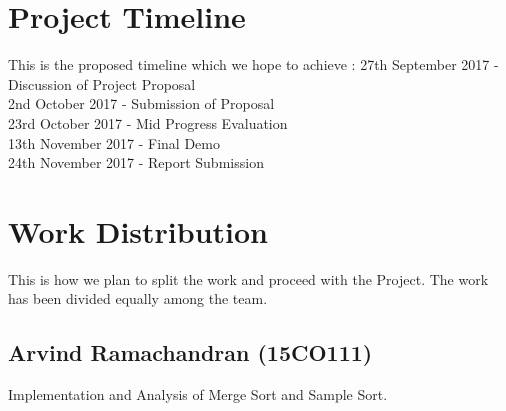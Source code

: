 \documentclass[conference]{IEEEtran}
\begin{document}
%



\section{Project Timeline }
This is the proposed timeline which we hope to achieve : 
27th September 2017 - Discussion of Project Proposal\\
2nd October 2017 - Submission of Proposal\\
23rd October 2017 - Mid Progress Evaluation\\
13th November 2017 - Final Demo\\
24th November 2017 - Report Submission\\

\section{Work Distribution}
This is how we plan to split the work and proceed with the Project.
The work has been divided equally among the team.
\subsection{Arvind Ramachandran (15CO111)}
Implementation and Analysis of Merge Sort and Sample Sort.
\end{document}
